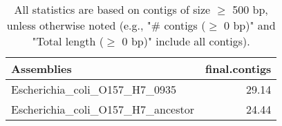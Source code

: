 \documentclass[12pt,a4paper]{article}
\begin{document}
\begin{table}[ht]
\begin{center}
\caption{All statistics are based on contigs of size $\geq$ 500 bp, unless otherwise noted (e.g., "\# contigs ($\geq$ 0 bp)" and "Total length ($\geq$ 0 bp)" include all contigs).}
\begin{tabular}{|l*{1}{|r}|}
\hline
Assemblies & final.contigs \\ \hline
Escherichia\_coli\_O157\_H7\_0935 & 29.14 \\ \hline
Escherichia\_coli\_O157\_H7\_ancestor & 24.44 \\ \hline
\end{tabular}
\end{center}
\end{table}
\end{document}
